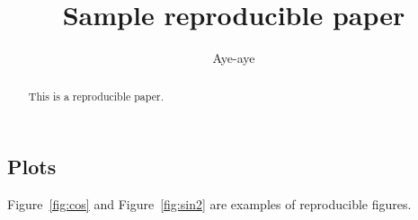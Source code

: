 \author{Aye-aye}
\title{Sample reproducible paper}
\begin{abstract}
  This is a reproducible paper. 
\end{abstract}

\subsection{Plots}
Figure~\ref{fig:cos} and Figure~\ref{fig:sin2} are
examples of reproducible figures.


